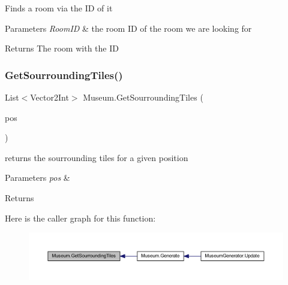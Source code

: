 Finds a room via the ID of it 


\begin{DoxyParams}{Parameters}
{\em Room\+ID} & the room ID of the room we are looking for\\
\hline
\end{DoxyParams}
\begin{DoxyReturn}{Returns}
The room with the ID
\end{DoxyReturn}
\mbox{\label{class_museum_af5b732fe3a0821d02852171a73cf8f8b}} 
\subsubsection{\texorpdfstring{Get\+Sourrounding\+Tiles()}{GetSourroundingTiles()}}
{\footnotesize\ttfamily List$<$Vector2\+Int$>$ Museum.\+Get\+Sourrounding\+Tiles (\begin{DoxyParamCaption}\item[{Vector2\+Int}]{pos }\end{DoxyParamCaption})\hspace{0.3cm}{\ttfamily [private]}}



returns the sourrounding tiles for a given position 


\begin{DoxyParams}{Parameters}
{\em pos} & \\
\hline
\end{DoxyParams}
\begin{DoxyReturn}{Returns}

\end{DoxyReturn}
Here is the caller graph for this function\+:
\nopagebreak
\begin{figure}[H]
\begin{center}
\leavevmode
\includegraphics[width=350pt]{class_museum_af5b732fe3a0821d02852171a73cf8f8b_icgraph}
\end{center}
\end{figure}
\mbox{\label{class_museum_a6a161feedcbb8a471eb0e68b7e3e4027}} 
